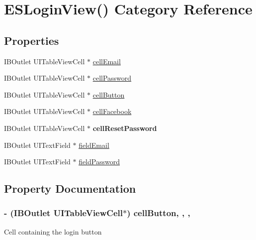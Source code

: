 \hypertarget{category_e_s_login_view_07_08}{}\section{E\+S\+Login\+View() Category Reference}
\label{category_e_s_login_view_07_08}
\subsection*{Properties}
\begin{DoxyCompactItemize}
\item 
I\+B\+Outlet U\+I\+Table\+View\+Cell $\ast$ \hyperlink{category_e_s_login_view_07_08_a5a0db15ba375bdb5653917b386e835e8}{cell\+Email}
\item 
I\+B\+Outlet U\+I\+Table\+View\+Cell $\ast$ \hyperlink{category_e_s_login_view_07_08_a589ebcc18094c451ce7971c68f7a5b25}{cell\+Password}
\item 
I\+B\+Outlet U\+I\+Table\+View\+Cell $\ast$ \hyperlink{category_e_s_login_view_07_08_a01f8218e809de1611d1e45ab39fd5bee}{cell\+Button}
\item 
I\+B\+Outlet U\+I\+Table\+View\+Cell $\ast$ \hyperlink{category_e_s_login_view_07_08_a75d84493e0bd02a6bf29ca3673bfd801}{cell\+Facebook}
\item 
\hypertarget{category_e_s_login_view_07_08_aaa0d5afd5197744cee6014ddf24b1aa0}{}I\+B\+Outlet U\+I\+Table\+View\+Cell $\ast$ {\bfseries cell\+Reset\+Password}\label{category_e_s_login_view_07_08_aaa0d5afd5197744cee6014ddf24b1aa0}

\item 
I\+B\+Outlet U\+I\+Text\+Field $\ast$ \hyperlink{category_e_s_login_view_07_08_a830205ad3358e6a584a213fe025bd14a}{field\+Email}
\item 
I\+B\+Outlet U\+I\+Text\+Field $\ast$ \hyperlink{category_e_s_login_view_07_08_a9c06e566742c5efce7636e4a7e65f07f}{field\+Password}
\end{DoxyCompactItemize}


\subsection{Property Documentation}
\hypertarget{category_e_s_login_view_07_08_a01f8218e809de1611d1e45ab39fd5bee}{}
\subsubsection[{cell\+Button}]{\setlength{\rightskip}{0pt plus 5cm}-\/ (I\+B\+Outlet U\+I\+Table\+View\+Cell$\ast$) cell\+Button\hspace{0.3cm}{\ttfamily [read]}, {\ttfamily [write]}, {\ttfamily [nonatomic]}, {\ttfamily [strong]}}\label{category_e_s_login_view_07_08_a01f8218e809de1611d1e45ab39fd5bee}
Cell containing the login button \hypertarget{category_e_s_login_view_07_08_a5a0db15ba375bdb5653917b386e835e8}{}
